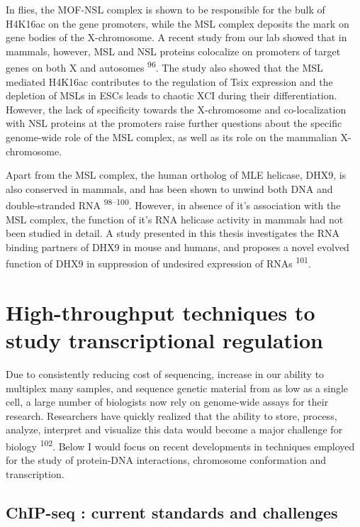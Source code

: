 \documentclass[11pt,twoside]{MPIthesis}
\theoremstyle{definition}
\theoremstyle{definition}
\theoremstyle{definition}
\theoremstyle{remark}
\begin{document}
In flies, the MOF-NSL complex is shown to be responsible for the bulk of
H4K16ac on the gene promoters, while the MSL complex deposits the mark
on gene bodies of the X-chromosome. A recent study from our lab showed
that in mammals, however, MSL and NSL proteins colocalize on promoters
of target genes on both X and autosomes \textsuperscript{96}. The study
also showed that the MSL mediated H4K16ac contributes to the regulation
of Tsix expression and the depletion of MSLs in ESCs leads to chaotic
XCI during their differentiation. However, the lack of specificity
towards the X-chromosome and co-localization with NSL proteins at the
promoters raise further questions about the specific genome-wide role of
the MSL complex, as well as its role on the mammalian X-chromosome.

Apart from the MSL complex, the human ortholog of MLE helicase, DHX9, is
also conserved in mammals, and has been shown to unwind both DNA and
double-stranded RNA \textsuperscript{98--100}. However, in absence of
it's association with the MSL complex, the function of it's RNA helicase
activity in mammals had not been studied in detail. A study presented in
this thesis investigates the RNA binding partners of DHX9 in mouse and
humans, and proposes a novel evolved function of DHX9 in suppression of
undesired expression of RNAs \textsuperscript{101}.

\section{High-throughput techniques to study transcriptional
regulation}\label{high-throughput-techniques-to-study-transcriptional-regulation}

Due to consistently reducing cost of sequencing, increase in our ability
to multiplex many samples, and sequence genetic material from as low as
a single cell, a large number of biologists now rely on genome-wide
assays for their research. Researchers have quickly realized that the
ability to store, process, analyze, interpret and visualize this data
would become a major challenge for biology \textsuperscript{102}. Below
I would focus on recent developments in techniques employed for the
study of protein-DNA interactions, chromosome conformation and
transcription.

\subsection{ChIP-seq : current standards and
challenges}\label{chip-seq-current-standards-and-challenges}
\end{document}
